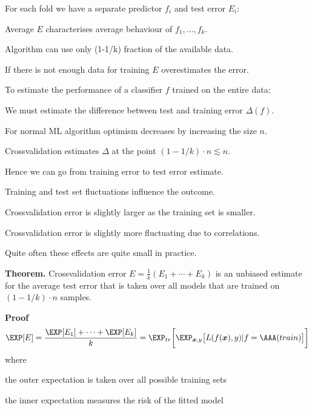 \documentclass[landscape,footrule]{foils}
\renewcommand{\vec}[1]{\boldsymbol{#1}}
\begin{document}

For each fold we have a separate predictor $f_i$ and test error $E_i$:
\begin{triangles}
\item Average $E$ characterises average behaviour of $f_1,\ldots, f_k$.
\item Algorithm can use only (1-1/k) fraction of the available data.
\item If there is not enough data for training $E$ overestimates the error. \vspace*{1cm}  
\end{triangles}

To estimate the performance of a classifier $f$ trained on the entire data:
\begin{triangles}
\item We must estimate the difference between test and training error $\Delta(f)$.
\item For normal ML algorithm optimism decreases by increasing the size $n$.
\item Crossvalidation estimates $\Delta$ at the point $(1-1/k)\cdot n \lesssim n$. 
\item Hence we can go from training error to test error estimate.
\item Training and test set fluctuations influence the outcome.  
\end{triangles}
 


\vspace*{-.5cm}
\begin{triangles}
\item Crossvalidation error is slightly larger as the training set is smaller.  
\item Crossvalidation error is slightly more fluctuating due to correlations. 
\item Quite often these effects are quite small in practice. 
\end{triangles}




\textbf{Theorem.} 
Crossvalidation error $E =\frac{1}{k}(E_1+\cdots+E_k)$ is an 
unbiased estimate for the average test error that is taken over all models that are trained on $(1-1/k)\cdot n$ samples. 

\textbf{Proof}
\begin{align*}
\EXP[E] =\frac{\EXP[E_1]+\cdots+\EXP[E_k]}{k}=\EXP_{tr}\biggl[\EXP_{\vec{x}, y}\bigl[L(f(\vec{x}),y)|f=\AAA(train)\bigr]\biggr]
\end{align*}
where 
\begin{triangles}
\item the outer expectation is taken over all possible training sets  
\item the inner expectation measures the risk of the fitted model
\end{triangles}
\end{document}
